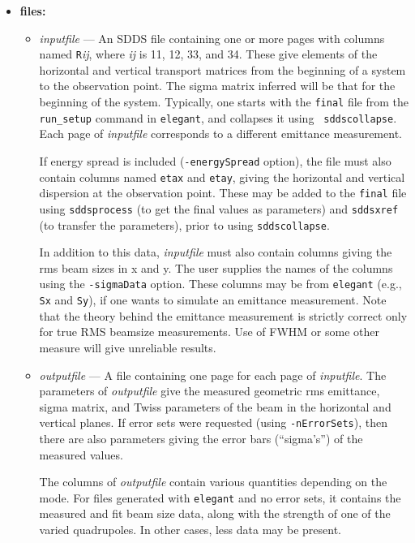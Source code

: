 \documentclass[11pt]{article}
\begin{document}
\begin{itemize}
\item {\bf files:}
\begin{itemize}

\item {\em inputfile} --- An SDDS file containing one or more pages
with columns named \verb|R|{\em ij}, where {\em ij} is 11, 12, 33, and
34.  These give elements of the horizontal and vertical transport
matrices from the beginning of a system to the observation point.  The
sigma matrix inferred will be that for the beginning of the system.
Typically, one starts with the {\tt final} file from the {\tt
run\_setup} command in {\tt elegant}, and collapses it using {\tt
sddscollapse}.  Each page of {\em inputfile} corresponds to a different
emittance measurement.

If energy spread is included (\verb|-energySpread| option), the file
must also contain columns named \verb|etax| and \verb|etay|, giving
the horizontal and vertical dispersion at the observation point.
These may be added to the {\tt final} file using {\tt sddsprocess} (to
get the final values as parameters) and {\tt sddsxref} (to transfer
the parameters), prior to using {\tt sddscollapse}.

In addition to this data, {\em inputfile} must also contain columns
giving the rms beam sizes in x and y.  The user supplies the names of
the columns using the \verb|-sigmaData| option.  These columns may be
from {\tt elegant} (e.g., \verb|Sx| and \verb|Sy|), if one wants to
simulate an emittance measurement.  Note that the theory behind the
emittance measurement is strictly correct only for true RMS beamsize
measurements.  Use of FWHM or some other measure will give unreliable
results.
 
\item {\em outputfile} --- A file containing one page for each page of
{\em inputfile}.  The parameters of {\em outputfile} give the measured
geometric rms emittance, sigma matrix, and Twiss parameters of the 
beam in the horizontal and vertical planes.  If error sets were requested
(using \verb|-nErrorSets|), then there are also parameters giving the
error bars (``sigma's'') of the measured values.

The columns of {\em outputfile} contain various quantities depending
on the mode.  For files generated with {\tt elegant} and no error sets,
it contains the measured and fit beam size data, along with the strength
of one of the varied quadrupoles.  In other cases, less data may be
present.

\end{itemize}


\end{itemize}
\end{document}
